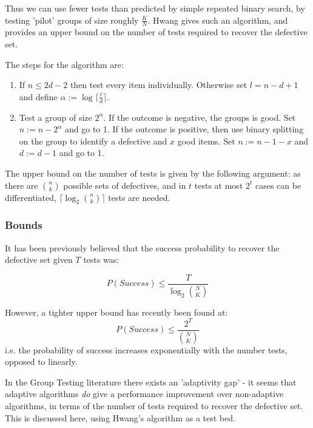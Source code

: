 \documentclass[12pt, a4paper]{article}
\begin{document}
Thus we can use fewer tests than predicted by simple repeated binary search, by testing 'pilot' groups of size roughly \(\frac{K}{N}\). Hwang \cite{Hwang1972} gives such an algorithm, and provides an upper bound on the number of tests required to recover the defective set.

The steps for the algorithm are:

\begin{enumerate}
\item If \(n \leq 2d-2\) then test every item individually. Otherwise set \(l = n - d + 1\) and define \(\alpha:=\log{\lceil \frac{l}{d}\rceil}\).
\item Test a group of size \(2^\alpha\). If the outcome is negative, the groups is good. Set \(n := n - 2^\alpha \) and go to 1. If the outcome is positive, then use binary splitting on the group to identify a defective and \(x\) good items. Set \(n := n - 1 -x \) and \(d:= d-1\) and go to 1.
\end{enumerate}

The upper bound on the number of tests is given by the following argument: as there are \(n \choose k\) possible sets of defectives, and in \(t\) tests at most \(2^t\) cases can be differentiated, \(\lceil \log_2{n \choose k} \rceil\) tests are needed. 

\subsubsection*{Bounds}
It has been previously believed that the success probability to recover the defective set given \(T\) tests was:

\begin{equation}
P\left(Success\right) \leq \frac{T}{\log_2{N \choose K}}
\end{equation}

However, a tighter upper bound has recently been found \cite{Aldridge2013} at:
%
\begin{equation}
P\left(Success\right) \leq \frac{2^T}{ {N \choose K} }
\end{equation}
%
i.e. the probability of success increases exponentially with the number tests, opposed to linearly. 

In the Group Testing literature there exists an 'adaptivity gap' - it seems that adaptive algorithms \textit{do} give a performance improvement over non-adaptive algorithms, in terms of the number of tests required to recover the defective set. This is discussed here, using Hwang's algorithm as a test bed.
\end{document}
